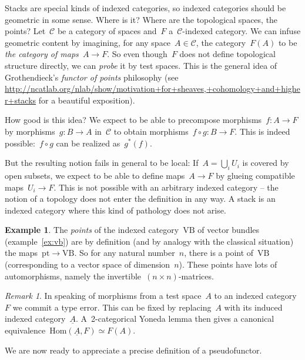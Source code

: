 \documentclass[a4paper,english,12pt]{scrartcl}
\theoremstyle{definition}
\newtheorem{ex}[defn]{Example}
\theoremstyle{plain}
\theoremstyle{remark}
\newtheorem{rem}[defn]{Remark}
\newcommand{\C}{\mathcal{C}}
\newcommand{\VB}{\mathrm{VB}}
\newcommand{\pt}{\mathrm{pt}}
\newcommand{\Hom}{\mathrm{Hom}}
\newcommand{\ul}[1]{\underline{#1}}
\begin{document}
Stacks are special kinds of indexed categories, so indexed categories should
be geometric in some sense. Where is it? Where are the topological spaces, the
points? Let~$\C$ be a category of spaces and~$F$ a~$\C$-indexed category. We
can infuse geometric content by imagining, for any space~$A \in \C$, the
category~$F(A)$ to be \emph{the category of maps~$A \to F$}. So even though~$F$
does not define topological structure directly, we can \emph{probe} it by test
spaces. This is the general idea of Grothendieck's \emph{functor of points}
philosophy (see
\url{http://ncatlab.org/nlab/show/motivation+for+sheaves,+cohomology+and+higher+stacks}
for a beautiful exposition).

How good is this idea? We expect to be able to precompose morphisms~$f : A \to F$
by morphisms~$g : B \to A$ in~$\C$ to obtain morphisms~$f \circ g : B \to F$.
This is indeed possible:~$f \circ g$ can be realized as~$g^*(f)$.

But the resulting notion fails in general to be local: If~$A = \bigcup_i U_i$
is covered by open subsets, we expect to be able to define maps~$A \to F$ by
glueing compatible maps~$U_i \to F$. This is not possible with an arbitrary
indexed category -- the notion of a topology does not enter the definition in
any way. A stack is an indexed category where this kind of pathology does not
arise.

\begin{ex}The \emph{points} of the indexed category~$\VB$ of vector bundles
(example~\ref{ex:vb}) are by definition (and by analogy with the classical
situation) the maps~$\pt \to \VB$. So for any natural number~$n$, there is a point
of~$\VB$ (corresponding to a vector space of dimension~$n$). These points
have lots of automorphisms, namely the invertible~$(n \times n)$-matrices.
\end{ex}

\begin{rem}In speaking of morphisms from a test space~$A$ to an indexed
category~$F$ we commit a type error. This can be fixed by replacing~$A$ with
its induced indexed category~$\ul{A}$. A~2-categorical Yoneda lemma then gives
a canonical equivalence~$\Hom(\ul{A},F) \simeq F(A)$.
\end{rem}

We are now ready to appreciate a precise definition of a pseudofunctor.
\end{document}
